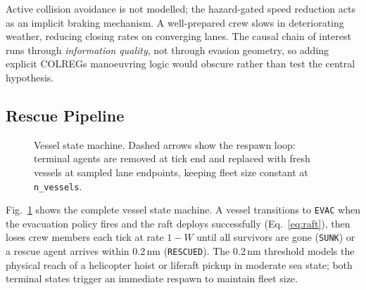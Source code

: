 \documentclass[cameraready]{Interspeech}
\begin{document}
Active collision avoidance is not modelled; the hazard-gated speed reduction acts as an implicit braking mechanism. A well-prepared crew slows in deteriorating weather, reducing closing rates on converging lanes. The causal chain of interest runs through \emph{information quality}, not through evasion geometry, so adding explicit COLREGs manoeuvring logic would obscure rather than test the central hypothesis.

\subsection{Rescue Pipeline}
\label{sec:rescue-impl}

\begin{figure}[htbp]
\centering
{}
\caption{Vessel state machine. Dashed arrows show the respawn loop: terminal agents are removed at tick end and replaced with fresh vessels at sampled lane endpoints, keeping fleet size constant at \texttt{n\_vessels}.}
\label{fig:fsm}
\end{figure}

Fig.~\ref{fig:fsm} shows the complete vessel state machine. A vessel transitions to \texttt{EVAC} when the evacuation policy fires and the raft deploys successfully (Eq.~\ref{eq:raft}), then loses crew members each tick at rate $1-W$ until all survivors are gone (\texttt{SUNK}) or a rescue agent arrives within 0.2\,nm (\texttt{RESCUED}). The 0.2\,nm threshold models the physical reach of a helicopter hoist or liferaft pickup in moderate sea state; both terminal states trigger an immediate respawn to maintain fleet size.
\end{document}
